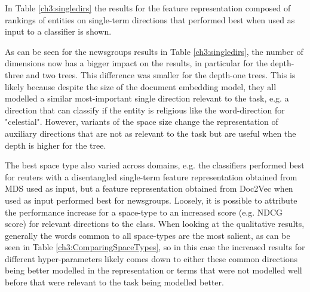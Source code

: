 In Table \ref{ch3:singledirs} the results for the feature representation composed of rankings of entities on single-term directions that performed best when used as input to a classifier is shown.



 
 As can be seen for the newsgroups results in Table \ref{ch3:singledirs}, the number of dimensions now has a bigger impact on the results, in particular for the depth-three and two trees. This difference was smaller for the depth-one trees. This is likely because despite the size of the document embedding model, they all modelled a similar most-important single direction relevant to the task, e.g. a direction that can classify if the entity is religious like the word-direction for "celestial". However, variants of the space size change the representation of auxiliary directions that are not as relevant to the task but are useful when the depth is higher for the tree.
 
 
The best space type also varied across domains, e.g. the classifiers performed best for reuters with a disentangled single-term feature representation obtained from MDS used as input, but a feature representation obtained from Doc2Vec when used as input performed best for newsgroups. Loosely, it is possible to attribute the performance increase for a space-type to an increased score (e.g. NDCG score) for relevant directions to the class. When looking at the qualitative results, generally the words common to all space-types are the most salient, as can be seen in Table \ref{ch3:ComparingSpaceTypes}, so in this case the increased results for different hyper-parameters likely comes down to either these common directions being better modelled in the representation or terms that were not modelled well before that were relevant to the task being modelled better.
 
 
